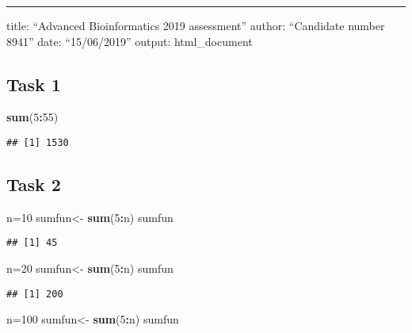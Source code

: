 \documentclass[]{article}
\title{}
\author{}
\date{}
\newenvironment{Shaded}{\begin{snugshade}}{\end{snugshade}}
\newcommand{\KeywordTok}[1]{\textcolor[rgb]{0.13,0.29,0.53}{\textbf{#1}}}
\newcommand{\DecValTok}[1]{\textcolor[rgb]{0.00,0.00,0.81}{#1}}
\newcommand{\StringTok}[1]{\textcolor[rgb]{0.31,0.60,0.02}{#1}}
\newcommand{\OperatorTok}[1]{\textcolor[rgb]{0.81,0.36,0.00}{\textbf{#1}}}
\newcommand{\NormalTok}[1]{#1}
\begin{document}
\begin{center}\rule{0.5\linewidth}{\linethickness}\end{center}

title: ``Advanced Bioinformatics 2019 assessment'' author: ``Candidate
number 8941'' date: ``15/06/2019'' output: html\_document

\subsection{Task 1}\label{task-1}

\begin{Shaded}
\begin{Highlighting}[]
\KeywordTok{sum}\NormalTok{(}\DecValTok{5}\OperatorTok{:}\DecValTok{55}\NormalTok{)}
\end{Highlighting}
\end{Shaded}

\begin{verbatim}
## [1] 1530
\end{verbatim}

\subsection{Task 2}\label{task-2}

\begin{Shaded}
\begin{Highlighting}[]
\NormalTok{n=}\DecValTok{10}
\NormalTok{sumfun<-}\StringTok{ }\KeywordTok{sum}\NormalTok{(}\DecValTok{5}\OperatorTok{:}\NormalTok{n)}
\NormalTok{sumfun}
\end{Highlighting}
\end{Shaded}

\begin{verbatim}
## [1] 45
\end{verbatim}

\begin{Shaded}
\begin{Highlighting}[]
\NormalTok{n=}\DecValTok{20}
\NormalTok{sumfun<-}\StringTok{ }\KeywordTok{sum}\NormalTok{(}\DecValTok{5}\OperatorTok{:}\NormalTok{n)}
\NormalTok{sumfun}
\end{Highlighting}
\end{Shaded}

\begin{verbatim}
## [1] 200
\end{verbatim}

\begin{Shaded}
\begin{Highlighting}[]
\NormalTok{n=}\DecValTok{100}
\NormalTok{sumfun<-}\StringTok{ }\KeywordTok{sum}\NormalTok{(}\DecValTok{5}\OperatorTok{:}\NormalTok{n)}
\NormalTok{sumfun}
\end{Highlighting}
\end{Shaded}
\end{document}
